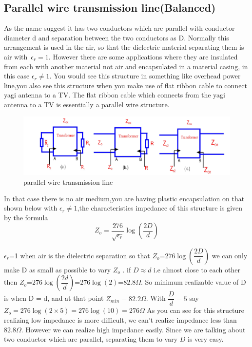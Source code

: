 \subsection{Parallel wire transmission line(Balanced)} 
As the name suggest it has two conductors which are parallel with conductor diameter d and separation between the two conductors as D. Normally this arrangement is used in the air, so that the dielectric material separating them is air with\ $\epsilon_r=1$. However  there are some applications where they are insulated from each with another material not air and encapsulated in a material casing, in this case $\epsilon_r\neq1$. You would see this structure in something like overhead power line,you also see this structure when you make use of flat ribbon cable to connect yagi antenna to a TV. The flat ribbon cable which connects from the yagi antenna to a TV is essentially a parallel wire structure.
\begin{figure}[h]
\centering
\includegraphics[width=1\linewidth]{./graphics/fig8}
\caption{parallel wire transmission line}
\end{figure}


In that case there is no air medium,you are having plastic encapsulation on that shown below with  $\epsilon_r\neq1$,the characteristics impedance of this structure is given by the formula 
\begin{equation*}
Z_o=\dfrac{276}{\sqrt{\epsilon_r}}\log(\dfrac{2D}{d})
\end{equation*}

$\epsilon_r$=1 when air is the dielectric separation so that $Z_o$=$276\log(\dfrac{2D}{d})$ we can only make D as small as possible to vary $Z_o$ . if $D\approx d$ i.e almost close to each other then $Z_o$=$276\log(\dfrac{2d}{d})$=$276\log(2)$=$82.8\Omega$. So minimum realizable value of D is when D = d, and at that point $Z_{min}=82.2\Omega$. With $\dfrac{D}{d}=5$ say $Z_o=276\log(2\times5)=276\log(10)=276\Omega$ As you can see for this structure realizing low impedance is more difficult, we can't realize impedance less than $82.8\Omega$. However we can realize high impedance easily. Since we are talking about two conductor which are parallel, separating them to vary $D$ is very easy.

